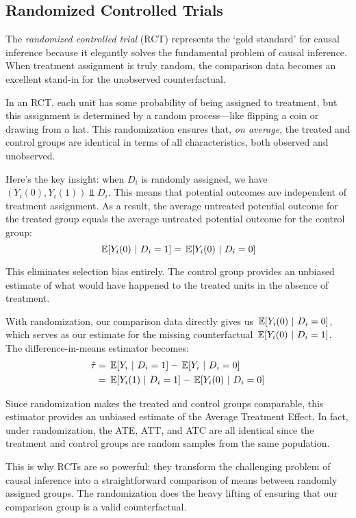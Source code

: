 \documentclass[12pt]{article}
\begin{document}
\begin{multicols}{2}
\section*{Randomized Controlled Trials}

The \emph{randomized controlled trial} (RCT) represents the `gold standard' for causal inference because it elegantly solves the fundamental problem of causal inference.
When treatment assignment is truly random, the comparison data becomes an excellent stand-in for the unobserved counterfactual.

In an RCT, each unit has some probability of being assigned to treatment, but this assignment is determined by a random process---like flipping a coin or drawing from a hat.
This randomization ensures that, \emph{on average}, the treated and control groups are identical in terms of all characteristics, both observed and unobserved.

Here's the key insight: when $D_i$ is randomly assigned, we have $(Y_i(0), Y_i(1)) \Perp D_i$.
This means that potential outcomes are independent of treatment assignment.
As a result, the average untreated potential outcome for the treated group equals the average untreated potential outcome for the control group:
$$\expec{Y_i(0)}{D_i = 1} = \expec{Y_i(0)}{D_i = 0}$$

This eliminates selection bias entirely.
The control group provides an unbiased estimate of what would have happened to the treated units in the absence of treatment.

With randomization, our comparison data directly gives us $\expec{Y_i(0)}{D_i = 0}$, which serves as our estimate for the missing counterfactual $\expec{Y_i(0)}{D_i = 1}$.
The difference-in-means estimator becomes:
\begin{align*}
  \hat{\tau} 
  &= \expec{Y_i}{D_i = 1} - \expec{Y_i}{D_i = 0} \\
  &= \expec{Y_i(1)}{D_i = 1} - \expec{Y_i(0)}{D_i = 0}
\end{align*}

Since randomization makes the treated and control groups comparable, this estimator provides an unbiased estimate of the Average Treatment Effect.
In fact, under randomization, the ATE, ATT, and ATC are all identical since the treatment and control groups are random samples from the same population.

This is why RCTs are so powerful: they transform the challenging problem of causal inference into a straightforward comparison of means between randomly assigned groups.
The randomization does the heavy lifting of ensuring that our comparison group is a valid counterfactual.


\end{multicols}
\end{document}
